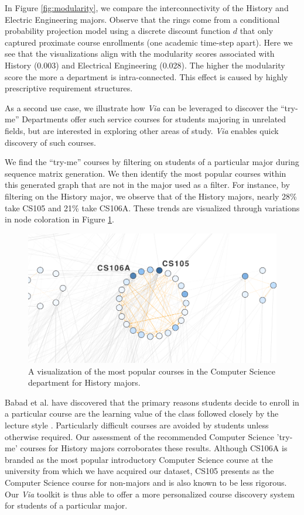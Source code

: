\documentclass{sigchi}
\begin{document}
In Figure \ref{fig:modularity}, we compare the interconnectivity of
the History and Electric Engineering majors.  Observe that the rings
come from a conditional probability projection model using a discrete
discount function $d$ that only captured proximate course enrollments
(one academic time-step apart). Here we see that the visualizations
align with the modularity scores associated with History (0.003) and
Electrical Engineering (0.028). The higher the modularity score the
more a department is intra-connected. This effect is caused by highly
prescriptive requirement structures.

As a second use case, we illustrate how \textit{Via} can be leveraged
to discover the ``try-me'' Departments offer such service courses for students
majoring in unrelated fields, but are interested in exploring other
areas of study. {\em Via} enables quick discovery of such courses.

We find the ``try-me'' courses by filtering on students of a
particular major during sequence matrix generation. We then identify
the most popular courses within this generated graph that are not in
the major used as a filter. For instance, by filtering on the History
major, we observe that of the History majors, nearly 28\% take CS105
and 21\% take CS106A. These trends are visualized through variations
in node coloration in Figure \ref{fig:history-try-me}.

\begin{figure}[h]
    \centering
    \includegraphics[width=.9\columnwidth]{final-history-try-me.pdf}
    \caption{A visualization of the most popular courses in the Computer Science department for History majors.}
    \label{fig:history-try-me}
\end{figure}

 Babad et al. have discovered that the primary reasons students decide to enroll in a particular course are the learning value of the class followed closely by the lecture style \cite{Babad2003}. Particularly difficult courses are avoided by students unless otherwise required. Our assessment of the recommended Computer Science 'try-me' courses for History majors corroborates these results. Although CS106A is branded as the most popular introductory Computer Science course at the university from which we have acquired our dataset, CS105 presents as the Computer Science course for non-majors and is also known to be less rigorous. Our \textit{Via} toolkit is thus able to offer a more personalized course discovery system for students of a particular major. 
 
\end{document}
